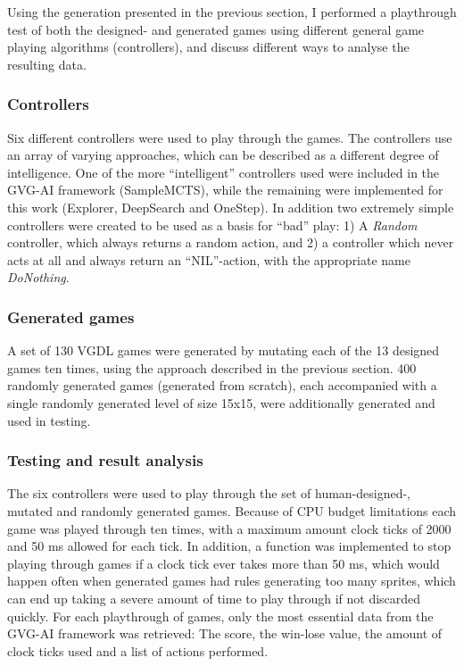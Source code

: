 \documentclass[a4paper,titlepage,final]{report}
\begin{document}
Using the generation presented in the previous section, I performed a playthrough test of both the designed- and generated games using different general game playing algorithms (controllers), and discuss different ways to analyse the resulting data.


\subsubsection*{Controllers}
Six different controllers were used to play through the games. 
The controllers use an array of varying approaches, which can be described as a different degree of intelligence. 
One of the more ``intelligent'' controllers used were included in the GVG-AI framework (SampleMCTS), while the remaining were implemented for this work (Explorer, DeepSearch and OneStep).
In addition two extremely simple controllers were created to be used as a basis for ``bad'' play:
1) A \textit{Random} controller, which always returns a random action, and 2) a controller which never acts at all and always return an ``NIL''-action, with the appropriate name \textit{DoNothing}.



\subsubsection*{Generated games}
A set of 130 VGDL games were generated by mutating each of the 13 designed games ten times, using the approach described in the previous section.
400 randomly generated games (generated from scratch), each accompanied with a single randomly generated level of size 15x15, were additionally generated and used in testing.

\subsubsection*{Testing and result analysis}
The six controllers were used to play through the set of human-designed-, mutated and randomly generated games. 
Because of CPU budget limitations each game was played through ten times, with a maximum amount clock ticks of 2000 and 50 ms allowed for each tick.
In addition, a function was implemented to stop playing through games if a clock tick ever takes more than 50 ms, which would happen often when generated games had rules generating too many sprites, which can end up taking a severe amount of time to play through if not discarded quickly.
For each playthrough of games, only the most essential data from the GVG-AI framework was retrieved: The score, the win-lose value, the amount of clock ticks used and a list of actions performed.
\end{document}
